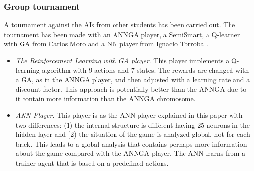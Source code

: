 		\subsubsection{Group tournament} %
		\label{ssub:group_tournament}
		A tournament against the AIs from other students has been carried out. The tournament has been made with an ANNGA player, a SemiSmart, a Q-learner with GA from Carlos Moro \cite{carlos} and a NN player from Ignacio Torroba \cite{nacho}.
		\begin{itemize}
			\item \emph{The Reinforcement Learning with GA player}. 
			This player implements a Q-learning algorithm with 9 actions and 7 states. 
			The rewards are changed with a GA, as in the ANNGA player, and then adjusted with a learning rate and a discount factor. 
			This approach is potentially better than the ANNGA due to it contain more information than the ANNGA chromosome.
			\item \emph{ANN Player}. This player is as the ANN player explained in this paper with two differences: (1) the internal structure is different having 25 neurons in the hidden layer and (2) the situation of the game is analyzed global, not for each brick. 
			This leads to a global analysis that contains perhaps more information about the game compared with the ANNGA player.
			The ANN learns from a trainer agent that is based on a predefined actions.
		\end{itemize}

